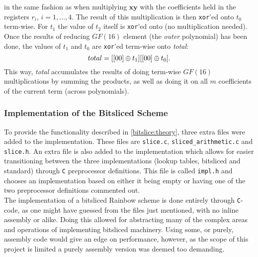 in the same fashion as when multiplying $\textbf{xy}$ with the coefficients held in the registers $r_i$, $i = 1,\dots, 4$. The result of this multiplication is then \texttt{xor}'ed onto $t_0$ term-wise. For $t_1$ the value of $t_2$ itself is \texttt{xor}'ed onto (no multiplication needed).\medskip\\
Once the results of reducing $GF(16)$ element (the \textit{outer} polynomial) has been done, the values of $t_1$ and $t_0$ are \texttt{xor}'ed term-wise onto \textit{total}:
$$
    total = [[00] \oplus t_1] [[00] \oplus t_0].
$$
This way, \textit{total} accumulates the results of doing term-wise $GF(16)$ multiplications by summing the products, as well as doing it on all $m$ coefficients of the current term (across polynomials).
\subsubsection{Implementation of the Bitsliced Scheme} \label{bitslice:implementation}
To provide the functionality described in \cref{bitslice:theory}, three extra files were added to the implementation. These files are \texttt{slice.c}, \texttt{sliced\_arithmetic.c} and \texttt{slice.h}. An extra file is also added to the implementation which allows for easier transitioning between the three implementations (lookup tables, bitsliced and standard) through \texttt{C} preprocessor definitions. This file is called \texttt{impl.h} and chooses an implementation based on either it being empty or having one of the two preprocessor definitions commented out.
\medskip\\
The implementation of a bitsliced Rainbow scheme is done entirely through \texttt{C}-code, as one might have guessed from the files just mentioned, with no inline assembly or alike. Doing this allowed for abstracting many of the complex areas and operations of implementing bitsliced machinery. Using some, or purely, assembly code would give an edge on performance, however, as the scope of this project is limited a purely assembly version was deemed too demanding.
